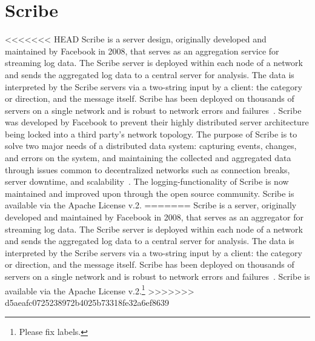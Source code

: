 \section{Scribe}

<<<<<<< HEAD
Scribe is a server design, originally developed and maintained by
Facebook in 2008, that serves as an aggregation service for streaming
log data. The Scribe server is deployed within each node of a network
and sends the aggregated log data to a central server for
analysis. The data is interpreted by the Scribe servers via a
two-string input by a client: the category or direction, and the
message itself. Scribe has been deployed on thousands of servers on a
single network and is robust to network errors and
failures~\cite{hid-sp18-507-FBScribe}. Scribe was developed by
Facebook to prevent their highly distributed server architecture being
locked into a third party's network topology. The purpose of Scribe is
to solve two major needs of a distributed data system: capturing
events, changes, and errors on the system, and maintaining the
collected and aggregated data through issues common to decentralized
networks such as connection breaks, server downtime, and
scalability~\cite{hid-sp18-507-ScribeNote}. The logging-functionality
of Scribe is now maintained and improved upon through the open source
community. Scribe is available via the Apache License v.2.
=======
Scribe is a server, originally developed and maintained by Facebook in 2008,
that serves as an aggregator for streaming log data. The Scribe server is
deployed within each node of a network and sends the aggregated log data to a
central server for analysis. The data is interpreted by the Scribe servers via a
two-string input by a client: the category or direction, and the message
itself. Scribe has been deployed on thousands of servers on a single network and
is robust to network errors and failures~\cite{FBScribe}. Scribe is available
via the Apache License v.2.\footnote{Please fix labels.}
>>>>>>> d5aeafc0725238972b4025b73318fe32a6ef8639
